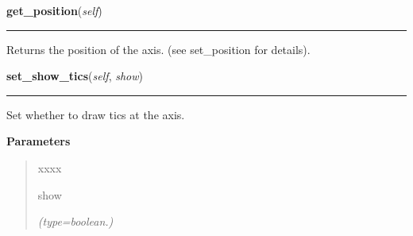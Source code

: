     \vspace{0.5ex}

\hspace{.8\funcindent}\begin{boxedminipage}{\funcwidth}

    \raggedright \textbf{get\_position}(\textit{self})

    \vspace{-1.5ex}

    \rule{\textwidth}{0.5\fboxrule}
\setlength{\parskip}{2ex}
    Returns the position of the axis. (see set\_position for details).

\setlength{\parskip}{1ex}
    \end{boxedminipage}

    \label{pygtk_chart:line_chart:Axis:set_show_tics}

    \vspace{0.5ex}

\hspace{.8\funcindent}\begin{boxedminipage}{\funcwidth}

    \raggedright \textbf{set\_show\_tics}(\textit{self}, \textit{show})

    \vspace{-1.5ex}

    \rule{\textwidth}{0.5\fboxrule}
\setlength{\parskip}{2ex}
    Set whether to draw tics at the axis.

\setlength{\parskip}{1ex}
      \textbf{Parameters}
      \vspace{-1ex}

      \begin{quote}
        \begin{Ventry}{xxxx}

          \item[show]

            {\it (type=boolean.)}

        \end{Ventry}

      \end{quote}

    \end{boxedminipage}

    \label{pygtk_chart:line_chart:Axis:get_show_tics}

